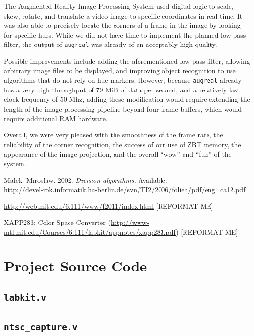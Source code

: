 \documentclass[10pt]{article}
\begin{document}
The Augmented Reality Image Processing System used digital logic to scale, skew, rotate, and translate a video image to specific coordinates in real time. It was also able to precisely locate the corners of a frame in the image by looking for specific hues. While we did not have time to implement the planned low pass filter, the output of {\tt augreal} was already of an acceptably high quality.

Possible improvements include adding the aforementioned low pass filter, allowing arbitrary image files to be displayed, and improving object recognition to use algorithms that do not rely on hue markers. However, because {\tt augreal} already has a very high throughput of 79 MiB of data per second, and a relatively fast clock frequency of 50 Mhz, adding these modification would require extending the length of the image processing pipeline beyond four frame buffers, which would require additional RAM hardware.

Overall, we were very pleased with the smoothness of the frame rate, the reliability of the corner recognition, the success of our use of ZBT memory, the appearance of the image projection, and the overall ``wow'' and ``fun'' of the system.

\begin{thebibliography}{9}

  Malek, Miroslaw.
  2002.
  \emph{Division algorithms.}
  Available: \\ \url{http://devel-rok.informatik.hu-berlin.de/svn/TI2/2006/folien/pdf/eng\_ca12.pdf}

  \url{http://web.mit.edu/6.111/www/f2011/index.html} [REFORMAT ME]

  XAPP283: Color Space Converter (\url{http://www-mtl.mit.edu/Courses/6.111/labkit/appnotes/xapp283.pdf}) [REFORMAT ME]

\end{thebibliography}

\newpage
\appendix
\section{Project Source Code}
\subsection{{\tt labkit.v}}


	  	
\subsection{{\tt ntsc\_capture.v}}
	  	
\end{document}
